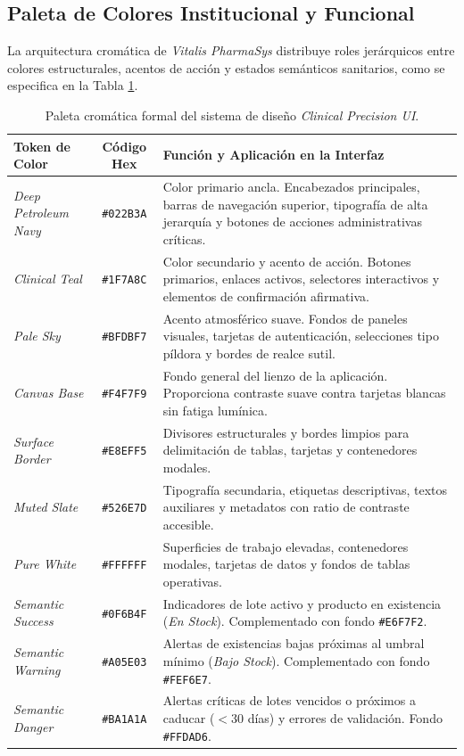 \subsection{Paleta de Colores Institucional y Funcional}
La arquitectura cromática de \textit{Vitalis PharmaSys} distribuye roles jerárquicos entre colores estructurales, acentos de acción y estados semánticos sanitarios, como se especifica en la Tabla \ref{tab:paleta_colores}.

\begin{table}[H]
\centering
\caption{Paleta cromática formal del sistema de diseño \textit{Clinical Precision UI}.}
\label{tab:paleta_colores}
\renewcommand{\arraystretch}{1.25}
\begin{tabularx}{\textwidth}{|l|c|X|}
\hline
\rowcolor[HTML]{E5E9EB}
\textbf{Token de Color} & \textbf{Código Hex} & \textbf{Función y Aplicación en la Interfaz} \\ \hline
\textit{Deep Petroleum Navy} & \texttt{\#022B3A} & Color primario ancla. Encabezados principales, barras de navegación superior, tipografía de alta jerarquía y botones de acciones administrativas críticas. \\ \hline
\textit{Clinical Teal} & \texttt{\#1F7A8C} & Color secundario y acento de acción. Botones primarios, enlaces activos, selectores interactivos y elementos de confirmación afirmativa. \\ \hline
\textit{Pale Sky} & \texttt{\#BFDBF7} & Acento atmosférico suave. Fondos de paneles visuales, tarjetas de autenticación, selecciones tipo píldora y bordes de realce sutil. \\ \hline
\textit{Canvas Base} & \texttt{\#F4F7F9} & Fondo general del lienzo de la aplicación. Proporciona contraste suave contra tarjetas blancas sin fatiga lumínica. \\ \hline
\textit{Surface Border} & \texttt{\#E8EFF5} & Divisores estructurales y bordes limpios para delimitación de tablas, tarjetas y contenedores modales. \\ \hline
\textit{Muted Slate} & \texttt{\#526E7D} & Tipografía secundaria, etiquetas descriptivas, textos auxiliares y metadatos con ratio de contraste accesible. \\ \hline
\textit{Pure White} & \texttt{\#FFFFFF} & Superficies de trabajo elevadas, contenedores modales, tarjetas de datos y fondos de tablas operativas. \\ \hline
\textit{Semantic Success} & \texttt{\#0F6B4F} & Indicadores de lote activo y producto en existencia (\textit{En Stock}). Complementado con fondo \texttt{\#E6F7F2}. \\ \hline
\textit{Semantic Warning} & \texttt{\#A05E03} & Alertas de existencias bajas próximas al umbral mínimo (\textit{Bajo Stock}). Complementado con fondo \texttt{\#FEF6E7}. \\ \hline
\textit{Semantic Danger} & \texttt{\#BA1A1A} & Alertas críticas de lotes vencidos o próximos a caducar ($<$30 días) y errores de validación. Fondo \texttt{\#FFDAD6}. \\ \hline
\end{tabularx}
\end{table}

